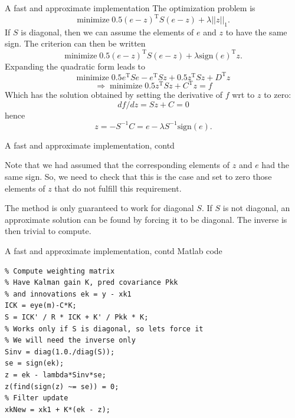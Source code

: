 \documentclass[presentation,aspectratio=169]{beamer}
\newcommand{\sign}{\mathrm{sign}}
\renewcommand{\transp}{^{\mathrm{T}}}
\begin{document}
\begin{frame}[label=sec-3-7]{A fast and approximate implementation}
The optimization problem is
\[ \text{minimize} \; 0.5(e-z)^{\mathrm{T}} S (e-z) + \lambda||z||_1. \]
If $S$ is diagonal, then we can assume the elements of $e$ and $z$ to have the same sign.
The criterion can then be written
\[ \text{minimize} \; 0.5(e-z)^{\mathrm{T}} S (e-z) + \lambda \sign(e)^{\mathrm{T}}z. \]
Expanding the quadratic form leads to
\[\text{minimize} \; 0.5e\transp Se - e\transp S z + 0.5z\transp S z + D\transp z\]
\[ \Rightarrow \; \text{minimize} \;  0.5z\transp S z + C\transp z = f \] 
Which has the solution obtained by setting the derivative of $f$ wrt to $z$ to zero: 
\[df/dz = Sz + C = 0 \]
hence
\[ z = -S^{-1}C = e - \lambda S^{-1}\sign(e). \]
\end{frame}

\begin{frame}[label=sec-3-8]{A fast and approximate implementation, contd}
\begin{block}{Note that we had assumed that the corresponding elements of $z$ and $e$ had the same sign. So, we need to check that this is the case and set to zero those elements of $z$ that do not fulfill this requirement.}
\end{block}
\begin{block}{The method is only guaranteed to work for diagonal \(S\). If \(S\) is not diagonal, an approximate solution can be found by forcing it to be diagonal. The inverse is then trivial to compute.}
\end{block}
\end{frame}

\begin{frame}[fragile,label=sec-3-9]{A fast and approximate implementation, contd}
 Matlab code
\begin{verbatim}
% Compute weighting matrix
% Have Kalman gain K, pred covariance Pkk
% and innovations ek = y - xk1
ICK = eye(m)-C*K;
S = ICK' / R * ICK + K' / Pkk * K;
% Works only if S is diagonal, so lets force it
% We will need the inverse only
Sinv = diag(1.0./diag(S));
se = sign(ek);
z = ek - lambda*Sinv*se;
z(find(sign(z) ~= se)) = 0;
% Filter update
xkNew = xk1 + K*(ek - z);
\end{verbatim}
\end{frame}
\end{document}
